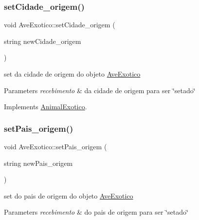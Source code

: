 \mbox{\label{class_ave_exotico_a3aa6b89421640efc1e1276098f1752fc}} 
\subsubsection{\texorpdfstring{setCidade\_origem()}{setCidade\_origem()}}
{\footnotesize\ttfamily void Ave\+Exotico\+::set\+Cidade\+\_\+origem (\begin{DoxyParamCaption}\item[{string}]{new\+Cidade\+\_\+origem }\end{DoxyParamCaption})\hspace{0.3cm}{\ttfamily [virtual]}}



set da cidade de origem do objeto \mbox{\hyperlink{class_ave_exotico}{Ave\+Exotico}} 


\begin{DoxyParams}{Parameters}
{\em recebimento} & da cidade de origem para ser \char`\"{}setado\char`\"{} \\
\hline
\end{DoxyParams}


Implements \mbox{\hyperlink{class_animal_exotico}{Animal\+Exotico}}.

\mbox{\label{class_ave_exotico_aabb170c4566302961935769168a4a681}} 
\subsubsection{\texorpdfstring{setPais\_origem()}{setPais\_origem()}}
{\footnotesize\ttfamily void Ave\+Exotico\+::set\+Pais\+\_\+origem (\begin{DoxyParamCaption}\item[{string}]{new\+Pais\+\_\+origem }\end{DoxyParamCaption})\hspace{0.3cm}{\ttfamily [virtual]}}



set do pais de origem do objeto \mbox{\hyperlink{class_ave_exotico}{Ave\+Exotico}} 


\begin{DoxyParams}{Parameters}
{\em recebimento} & do pais de origem para ser \char`\"{}setado\char`\"{} \\
\hline
\end{DoxyParams}


